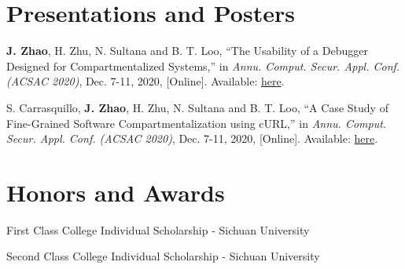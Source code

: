 \documentclass[a4paper]{article}
\begin{document}
\vspace{-2pt}
\section{Presentations and Posters}
\begin{description}[font=$\bullet$,leftmargin=!]
  \item \small{\textbf{J. Zhao}, H. Zhu, N. Sultana and B. T. Loo, ``The
          Usability of a Debugger Designed for Compartmentalized Systems,'' in
          \textit{Annu. Comput. Secur. Appl. Conf. (ACSAC 2020)}, Dec. 7-11,
          2020, [Online]. Available:
          \href{https://www.acsac.org/2020/program/poster-wips/2020-poster-09\%20The\%20Usability\%20of\%20a\%20Debugger\%20Designed\%20for\%20Compartmentalized\%20Systems.pdf}{here}.
        }
  \item \small{S. Carrasquillo, \textbf{J. Zhao}, H. Zhu, N. Sultana and B. T.
          Loo, ``A Case Study of Fine-Grained Software Compartmentalization
          using cURL,'' in \textit{Annu. Comput. Secur. Appl. Conf. (ACSAC
            2020)}, Dec. 7-11, 2020, [Online]. Available:
          \href{https://www.acsac.org/2020/program/poster-wips/2020-poster-10-A\%20Case\%20Study\%20of\%20Fine-Grained\%20Software\%20Compartmentalization\%20using\%20cURL.pdf}{here}.
        }
\end{description}

\vspace{-2pt}
\section{Honors and Awards}
\begin{description}[font=$\bullet$]
  \item \small{First Class College Individual Scholarship - Sichuan University}
        \vspace{-5pt}
  \item \small{Second Class College Individual Scholarship - Sichuan University}
        \vspace{-5pt}
\end{description}
\end{document}
